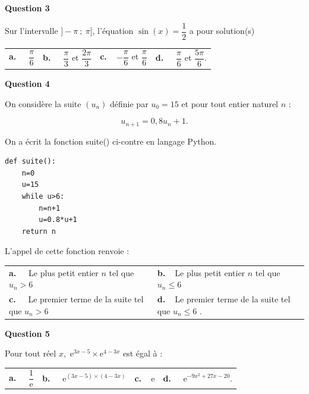 \documentclass[10pt]{article}
\providecommand{\e}{{\mathrm{e}}}
\begin{document}
\medskip
\textbf{Question 3}
\medskip 

Sur l'intervalle $] -\pi~;~\pi]$, l'équation $\sin(x) = \dfrac{1}{2}$
a pour solution(s)

\medskip
\begin{tabularx}{\linewidth}{*{4}{X}}
\textbf{a.~~} $\dfrac{\pi}{6} $ &\textbf{b.~~} $\dfrac{\pi}{3}$ et $\dfrac{2\pi}{3} $&\textbf{c.~~}$-\dfrac{\pi}{6}$ et $\dfrac{\pi}{6} $& \textbf{d.~~} $\dfrac{\pi}{6}$ et $\dfrac{5\pi}{6} $.
\end{tabularx}

\medskip

\textbf{Question 4}

\medskip 

On considère la suite $\left(u_n\right)$ définie par $u_0 = 15$ et pour tout entier naturel $n$ :

\[u_{n+1} = 0,8 u_n + 1.\]

On a écrit la fonction suite() ci-contre en langage Python.

\begin{lstlisting}[style=python]
def suite():
	n=0
	u=15
	while u>6:
		n=n+1
		u=0.8*u+1
	return n
\end{lstlisting}

L'appel de cette fonction renvoie :

\medskip

\begin{tabularx}{\linewidth}{*{2}{X}}
\textbf{a.~~} Le plus petit entier $n$ tel que $u_n > 6$ &\textbf{b.~~}Le plus petit entier $n$ tel que $u_n \leqslant 6$ \\\textbf{c.~~} Le premier terme de la suite tel que $u_n > 6$ & \textbf{d.~~}Le premier terme de la suite tel que $u_n \leqslant 6$ .
\end{tabularx}

\medskip

\textbf{Question 5}

\medskip 

Pour tout réel $x$,\, $\e^{3x-5} \times \e^{4 - 3x}$ est égal à :

\begin{tabularx}{\linewidth}{*{4}{X}}
\textbf{a.~~} $\dfrac{1}{\text{e}}$ &\textbf{b.~~} $ \e^{(3x-5)\times(4-3x)}$&\textbf{c.~~}$ \e $& \textbf{d.~~} $\e^{-9x^2+27x-20} $.
\end{tabularx}

\vspace{0,5cm}
\end{document}
